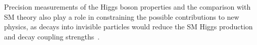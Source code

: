 Precision measurements of the Higgs boson properties and the comparison with SM theory also play a role in constraining the possible contributions to new physics, as decays into invisible particles would reduce the SM Higgs production and decay coupling strengths~\cite{Khachatryan:2016vau,Englert:2011yb,Aad:2015pla}. 

























